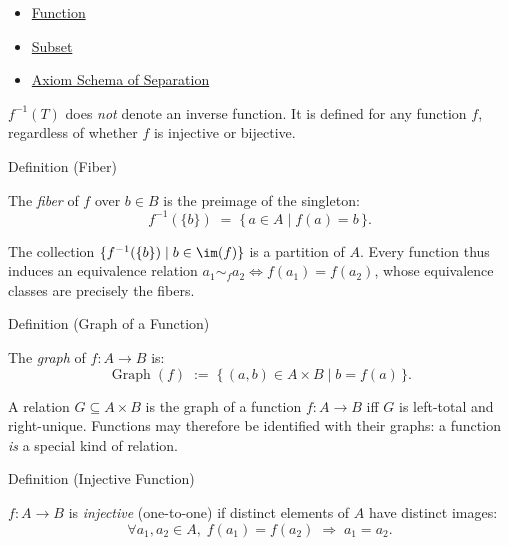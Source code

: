 \begin{dependencies}
\begin{itemize}
  \item \hyperref[def:function]{Function}
  \item \hyperref[def:subset]{Subset}
  \item \hyperref[ax:separation]{Axiom Schema of Separation}
\end{itemize}
\end{dependencies}

\begin{remark*}
$f^{-1}(T)$ does \emph{not} denote an inverse function. It is defined for any
function $f$, regardless of whether $f$ is injective or bijective.
\end{remark*}

\begin{definitionbox}{Definition (Fiber)}
\begin{definition}[Fiber]\label{def:fiber}
The \emph{fiber} of $f$ over $b \in B$ is the preimage of the singleton:
\[
f^{-1}(\{b\}) \;=\; \{\, a \in A \mid f(a) = b \,\}.
\]
\end{definition}
\end{definitionbox}

\begin{remark*}
The collection $\{f^{-1}(\{b\}) \mid b \in \im(f)\}$ is a partition of $A$.
Every function thus induces an equivalence relation $a_1 \sim_f a_2 \iff f(a_1) = f(a_2)$,
whose equivalence classes are precisely the fibers.
\end{remark*}

\begin{definitionbox}{Definition (Graph of a Function)}
\begin{definition}\label{def:graph}
The \emph{graph} of $f : A \to B$ is:
\[
\operatorname{Graph}(f)
\;:=\;
\{\, (a,b) \in A \times B \mid b = f(a) \,\}.
\]
\end{definition}
\end{definitionbox}

\begin{remark*}
A relation $G \subseteq A \times B$ is the graph of a function $f : A \to B$
iff $G$ is left-total and right-unique. Functions may therefore be identified
with their graphs: a function \emph{is} a special kind of relation.
\end{remark*}

\begin{definitionbox}{Definition (Injective Function)}
\begin{definition}\label{def:injective}
$f : A \to B$ is \emph{injective} (one-to-one) if distinct elements of $A$
have distinct images:
\[
\forall a_1,a_2 \in A,\;
f(a_1)=f(a_2) \;\Longrightarrow\; a_1=a_2.
\]
\end{definition}
\end{definitionbox}

